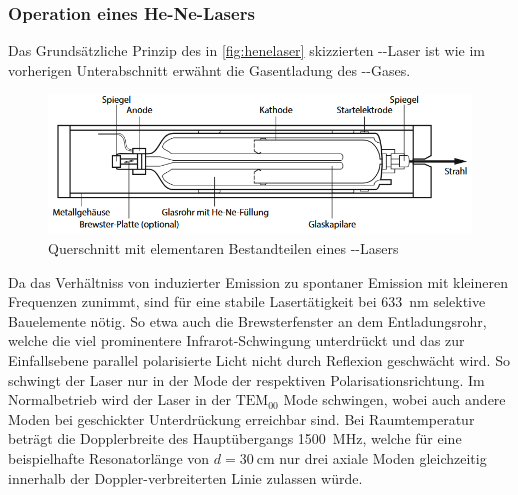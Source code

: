 \subsubsection{Operation eines He-Ne-Lasers}
Das Grundsätzliche Prinzip des in \autoref{fig:henelaser} skizzierten --Laser ist wie im vorherigen Unterabschnitt erwähnt die Gasentladung des --Gases.
\begin{figure}[H]
    \centering
    \includegraphics[scale=0.7]{Ressourcen/henelaser.png}
    \caption{Querschnitt mit elementaren Bestandteilen eines --Lasers\cite{eichler}}\label{fig:henelaser}
\end{figure}
Da das Verhältniss von induzierter Emission zu spontaner Emission mit kleineren Frequenzen zunimmt, sind für eine stabile Lasertätigkeit bei \SI{633}{\nano\meter} selektive Bauelemente nötig.
So etwa auch die Brewsterfenster an dem Entladungsrohr, welche die viel prominentere Infrarot-Schwingung unterdrückt und das zur Einfallsebene parallel polarisierte Licht nicht durch Reflexion geschwächt wird. So schwingt der Laser nur in der Mode der respektiven Polarisationsrichtung.
Im Normalbetrieb wird der Laser in der $\mathrm{TEM_{00}}$ Mode schwingen, wobei auch andere Moden bei geschickter Unterdrückung erreichbar sind. Bei Raumtemperatur beträgt die Dopplerbreite des Hauptübergangs \SI{1500}{\mega\hertz}, welche für eine beispielhafte Resonatorlänge von $d=\SI{30}{\centi\meter}$ nur drei axiale Moden gleichzeitig innerhalb der Doppler-verbreiterten Linie zulassen würde.